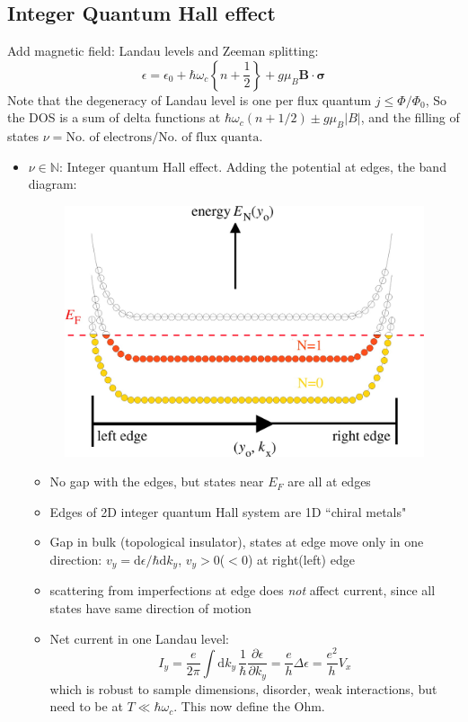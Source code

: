 \documentclass[11pt,letterpaper]{article}
\numberwithin{equation}{section} %
\renewcommand*{\vec}[1]{\bm{#1}}
\newcommand{\dif}{\mathrm d}
\begin{document}
\subsection{Integer Quantum Hall effect}
\label{sub:integer_quantum_hall_effect}
Add magnetic field: Landau levels and Zeeman splitting: 
\begin{equation}\label{eq:e_in_2d}
	\epsilon = \epsilon_0 + \hbar\omega_c \left\{ n+\frac 12 \right\} 
	+ g\mu_B \vec B\cdot\vec\sigma
\end{equation}
Note that the degeneracy of Landau level is one per flux quantum $j\le
\Phi/\Phi_0$, So the DOS is a sum of delta functions at $\hbar\omega_c ( n+
1/2)\pm g\mu_B |B|$, and the filling of states $\nu = \mbox{No. of
electrons}/\mbox{No. of flux quanta}$. 
\begin{itemize}
  \item $\nu\in\mathbb N$: Integer quantum Hall effect. Adding the potential
	  at edges, the band diagram: 
	  \begin{figure}[htpb]
	    \centering
	    \includegraphics[width=0.6\linewidth]{integral_q_hall.jpg}
	  \end{figure}
	  \begin{itemize}
	    \item No gap with the edges, but states near $E_F$ are all at edges
		\item Edges of 2D integer quantum Hall system are 1D ``chiral metals"
		\item Gap in bulk (topological insulator), states at edge move only
			in one direction: $v_y = \dif\epsilon/\hbar\dif k_y$,
			$v_y>0$($<0$) at right(left) edge
		\item scattering from imperfections at edge does \emph{not} affect
			current, since all states have same direction of motion
		\item Net current in one Landau level: 
			\begin{equation}
				I_y = \frac{e}{2\pi}\int\dif k_y\, \frac 1\hbar
				\frac{\partial\epsilon}{\partial k_y} 
				= \frac eh \Delta \epsilon = \frac{e^2}{h}V_x
			\end{equation}
			which is robust to sample dimensions, disorder, weak
			interactions, but need to be at $T\ll \hbar\omega_c$.
			This now define the Ohm. 
	  \end{itemize}
\end{itemize}
\end{document}
